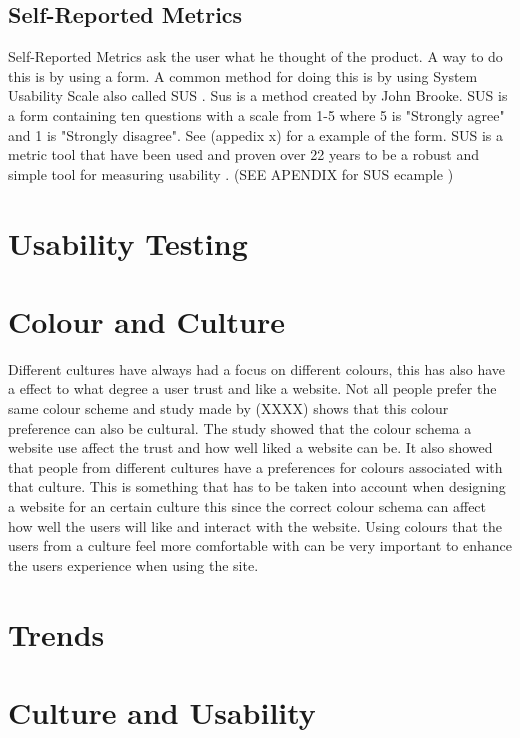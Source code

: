 \subsection{Self-Reported Metrics}
Self-Reported Metrics ask the user what he thought of the product. A way to do this is by using a form. A common method for doing this is by using System Usability Scale also called SUS \cite{tullis_albert_2011} \cite{brooke1996sus}. Sus is a method created by John Brooke. SUS is a form containing ten questions with a scale from 1-5 where 5 is "Strongly agree" and 1 is "Strongly disagree". See (appedix x) for a example of the form. SUS is a metric tool that have been used and proven over 22 years to be a robust and simple tool for measuring usability \cite{brooke1996sus}.  (SEE APENDIX for SUS ecample )
\section{Usability Testing}
\section{Colour and Culture}
Different cultures have always had a focus on different colours, this has also have a effect to what degree a user trust and like a website. Not all people prefer the same colour scheme and study made by (XXXX) \cite{Color} shows that this colour preference can also be cultural. The study showed that the colour schema a website use affect the trust and how well liked a website can be. It also showed that people from different cultures have a preferences for colours associated with that culture. This is something that has to be taken into account when designing a website for an certain culture this since the correct colour schema can affect how well the users will like and interact with the website. Using colours that the users from a culture feel more comfortable with can be very important to enhance the users experience when using the site.
\section{Trends}
\section{Culture and Usability}

